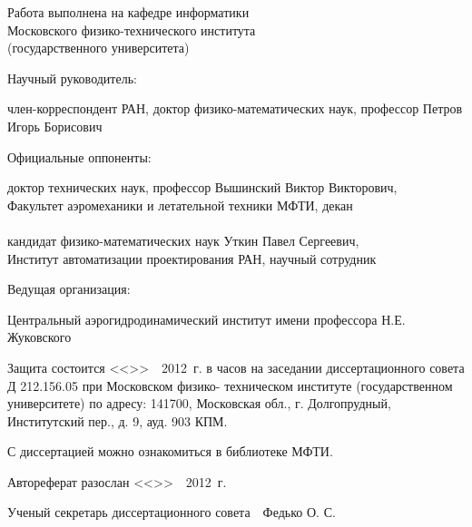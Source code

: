 \noindent
Работа выполнена на кафедре информатики\\
Московского физико-технического института\\
(государственного университета)\\

\vspace{3em}

\noindent
\begin{minipage}[t]{0.4\textwidth}
Научный руководитель:
\end{minipage}
\begin{minipage}[t]{0.6\textwidth}
член-корреспондент РАН, доктор физико-математических наук, профессор Петров Игорь Борисович
\end{minipage}

\vspace{3em}

\noindent
\begin{minipage}[t]{0.4\textwidth}
Официальные оппоненты:
\end{minipage}
\begin{minipage}[t]{0.6\textwidth}
доктор технических наук, профессор Вышинский Виктор Викторович,\\
Факультет аэромеханики и летательной техники МФТИ, декан\\
 \\
кандидат физико-математических наук Уткин Павел Сергеевич,\\
Институт автоматизации проектирования РАН, научный сотрудник
\end{minipage}

\vspace{3em}

\noindent
\begin{minipage}[t]{0.4\textwidth}
Ведущая организация:
\end{minipage}
\begin{minipage}[t]{0.6\textwidth}
Центральный аэрогидродинамический институт имени профессора Н.Е. Жуковского
\end{minipage}

\vspace{6em}

\noindent
Защита состоится <<\underline{\hspace{10 mm}}>>\ \underline{\hspace{50 mm}}\ 2012~г. в \underline{\hspace{20 mm}} часов на заседании
диссертационного совета Д 212.156.05 при Московском физико-
техническом институте (государственном университете) по адресу:
141700, Московская обл., г. Долгопрудный, Институтский пер., д. 9, ауд.
903 КПМ.

\vspace{2em}

\noindent
С диссертацией можно ознакомиться в библиотеке МФТИ.

\vspace{2em}

\noindent
Автореферат разослан <<\underline{\hspace{10 mm}}>>\ \underline{\hspace{50 mm}}\ 2012~г.

\vspace{\fill}

\noindent
Ученый секретарь диссертационного совета\ \hspace{40 mm}\ Федько О. С.


